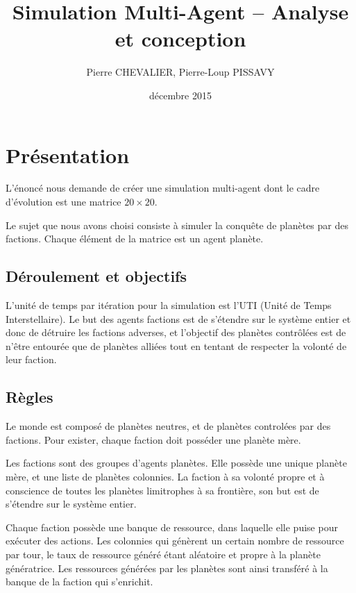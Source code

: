 \documentclass{article}
\title{Simulation Multi-Agent -- Analyse et conception}
\author{Pierre CHEVALIER, Pierre-Loup PISSAVY}
\date{décembre 2015}
\begin{document}
  \maketitle
  \setlength{\parskip}{10pt}

  \section{Présentation}

    L'énoncé nous demande de créer une simulation multi-agent dont le cadre d'évolution est une matrice $20 \times 20$.

    Le sujet que nous avons choisi consiste à simuler la conquête de planètes par des factions. Chaque élément de la matrice est un agent planète.

    \subsection{Déroulement et objectifs}

    L'unité de temps par itération pour la simulation est l'UTI (Unité de Temps Interstellaire). Le but des agents factions est de s'étendre sur le système entier et donc de détruire les factions adverses, et l'objectif des planètes contrôlées est de n'être entourée que de planètes alliées tout en tentant de respecter la volonté de leur faction.

    \subsection{Règles}
	
    Le monde est composé de planètes neutres, et de planètes controlées par des factions. Pour exister, chaque faction doit posséder une planète mère.
	
	Les factions sont des groupes d'agents planètes. Elle possède une unique planète mère, et une liste de planètes colonnies. La faction à sa volonté propre et à conscience de toutes les planètes limitrophes à sa frontière, son but est de s'étendre sur le système entier.

	Chaque faction possède une banque de ressource, dans laquelle elle puise pour exécuter des actions. Les colonnies qui génèrent un certain nombre de ressource par tour, le taux de ressource généré étant aléatoire et propre à la planète génératrice. Les ressources générées par les planètes sont ainsi transféré à la banque de la faction qui s'enrichit.
	
\end{document}
